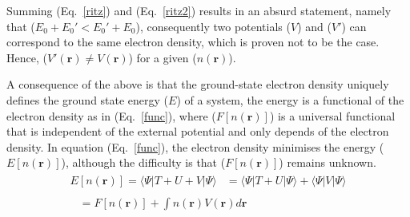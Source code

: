 %
%
Summing (Eq.~\ref{ritz}) and (Eq.~\ref{ritz2}) results in an absurd statement, namely that ($E_0 + E_0 ' < E_0' + E_0$), consequently two potentials ($V$) and ($V'$) can correspond to the same electron density, which is proven not to be the case. Hence, ($V'(\mathbf{r}) \neq V(\mathbf{r})$) for a given ($n(\mathbf{r})$).

A consequence of the above is that the ground-state electron density uniquely defines the ground state energy ($E$) of a system, the energy is a functional of the electron density as in (Eq.~\ref{func}), where ($F[n(\mathbf{r})]$) is a universal functional that is independent of the external potential and only depends of the electron density. In equation (Eq.~\ref{func}), the electron density minimises the energy ($E[n(\mathbf{r})]$), although the difficulty is that ($F[n(\mathbf{r})]$) remains unknown. 
%
\begin{subequations} \label{func}
\begin{align}
\begin{split}
E[n(\mathbf{r})] =  \langle \Psi|T + U + V|\Psi\rangle &= \langle \Psi|T + U|\Psi\rangle + \langle \Psi|V|\Psi\rangle
\end{split}\\
\begin{split}
&= F[n(\mathbf{r})] + \int n(\mathbf{r}) V(\mathbf{r}) d \mathbf{r}
\end{split}
\end{align}
\end{subequations}
%
%
